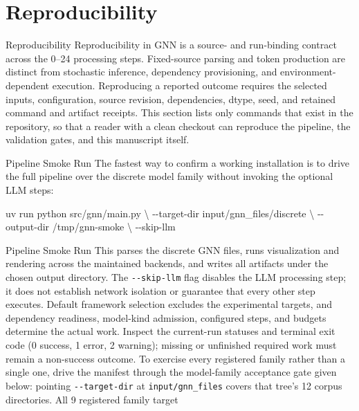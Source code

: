 \documentclass[
  ignorenonframetext,
]{beamer}
\author{\texorpdfstring{}{}}
\date{}
\newenvironment{Shaded}{}{}
\newcommand{\AttributeTok}[1]{\textcolor[rgb]{0.49,0.56,0.16}{#1}}
\newcommand{\DataTypeTok}[1]{\textcolor[rgb]{0.56,0.13,0.00}{#1}}
\newcommand{\ExtensionTok}[1]{#1}
\newcommand{\NormalTok}[1]{#1}
\begin{document}
\section{Reproducibility}\label{sec:reproducibility}

\begin{frame}[allowframebreaks]{Reproducibility}
Reproducibility in GNN is a source- and run-binding contract across the
0--24 processing steps. Fixed-source parsing and token production are
distinct from stochastic inference, dependency provisioning, and
environment-dependent execution. Reproducing a reported outcome requires
the selected inputs, configuration, source revision, dependencies,
dtype, seed, and retained command and artifact receipts. This section
lists only commands that exist in the repository, so that a reader with
a clean checkout can reproduce the pipeline, the validation gates, and
this manuscript itself.
\end{frame}

\begin{frame}{Pipeline Smoke Run}
\protect{}\label{pipeline-smoke-run}
The fastest way to confirm a working installation is to drive the full
pipeline over the discrete model family without invoking the optional
LLM steps:

\begin{Shaded}
\begin{Highlighting}[]
\ExtensionTok{uv}\NormalTok{ run python src/gnn/main.py }\DataTypeTok{\textbackslash{}}
  \AttributeTok{{-}{-}target{-}dir}\NormalTok{ input/gnn\_files/discrete }\DataTypeTok{\textbackslash{}}
  \AttributeTok{{-}{-}output{-}dir}\NormalTok{ /tmp/gnn{-}smoke }\DataTypeTok{\textbackslash{}}
  \AttributeTok{{-}{-}skip{-}llm}
\end{Highlighting}
\end{Shaded}

\end{frame}

\begin{frame}{Pipeline Smoke Run}
This parses the discrete GNN files, runs visualization and rendering
across the maintained backends, and writes all artifacts under the
chosen output directory. The \texttt{-\/-skip-llm} flag disables the LLM
processing step; it does not establish network isolation or guarantee
that every other step executes. Default framework selection excludes the
experimental targets, and dependency readiness, model-kind admission,
configured steps, and budgets determine the actual work. Inspect the
current-run statuses and terminal exit code (0 success, 1 error, 2
warning); missing or unfinished required work must remain a non-success
outcome. To exercise every registered family rather than a single one,
drive the manifest through the model-family acceptance gate given below:
pointing \texttt{-\/-target-dir} at \texttt{input/gnn\_files} covers
that tree's 12 corpus directories. All 9 registered family target
\end{frame}
\end{document}
